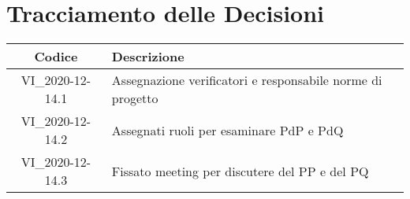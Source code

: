 \section*{Tracciamento delle Decisioni}

\begin{center}
	\begin{longtable}{|c|p{14.5cm}|}
	\hline
	\rowcolor{lighter-grayer}
	\textbf{Codice} & \textbf{Descrizione} \\
	\hline
	\endfirsthead

	\hline
	VI\_2020-12-14.1 & Assegnazione verificatori e responsabile norme di progetto\\
	VI\_2020-12-14.2 & Assegnati ruoli per esaminare PdP e PdQ\\
	VI\_2020-12-14.3 & Fissato meeting per discutere del PP e del PQ \\
	\hline

	\end{longtable}
\end{center}